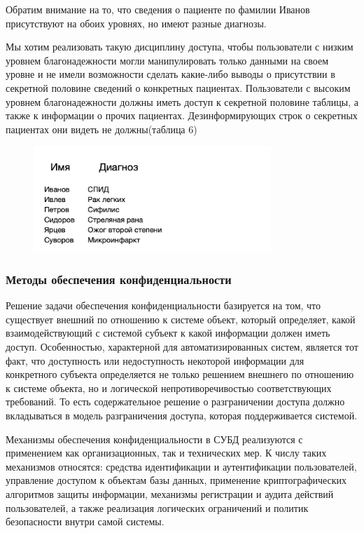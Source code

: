 Обратим внимание на то, что сведения о пациенте по фамилии Иванов присутствуют на обоих уровнях,
но имеют разные диагнозы.

Мы хотим реализовать такую дисциплину доступа, чтобы пользователи с низким уровнем благонадежности
могли манипулировать только данными на своем уровне и не имели возможности сделать какие-либо
выводы о присутствии в секретной половине сведений о конкретных пациентах. Пользователи с высоким
уровнем благонадежности должны иметь доступ к секретной половине таблицы, а также к информации о
прочих пациентах. Дезинформирующих строк о секретных пациентах они видеть не должны(таблица 6)

\begin{figure}[h]
    \centering
    \includegraphics[width=0.8\textwidth]{assets/diagnoses3.png}
\end{figure}

\subsubsection{Методы обеспечения конфиденциальности}

Решение задачи обеспечения конфиденциальности базируется на том, что существует внешний по отношению к системе объект, который определяет, какой взаимодействующий с системой субъект к какой информации должен иметь доступ. Особенностью, характерной для автоматизированных систем, является тот факт, что доступность или недоступность некоторой информации для конкретного субъекта определяется не только решением внешнего по отношению к системе объекта, но и логической непротиворечивостью соответствующих требований. То есть содержательное решение о разграничении доступа должно вкладываться в модель разграничения доступа, которая поддерживается системой.\cite{Smirnov2007}

Механизмы обеспечения конфиденциальности в СУБД реализуются с применением как организационных, так и технических мер. К числу таких механизмов относятся: средства идентификации и аутентификации пользователей, управление доступом к объектам базы данных, применение криптографических алгоритмов защиты информации, механизмы регистрации и аудита действий пользователей, а также реализация логических ограничений и политик безопасности внутри самой системы.\cite{Smirnov2007}


